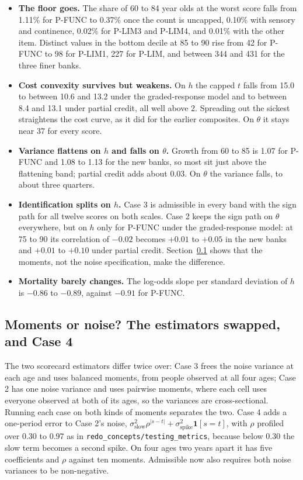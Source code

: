 \documentclass[11pt]{article}
\newcommand{\code}[1]{\texttt{\small #1}}
\begin{document}
\begin{itemize}\itemsep2pt
\item \textbf{The floor goes.} The share of 60 to 84 year olds at the worst
score falls from 1.11\% for P-FUNC to 0.37\% once the count is uncapped,
0.10\% with sensory and continence, 0.02\% for P-LIM3 and P-LIM4, and 0.01\%
with the other item. Distinct values in the bottom decile at 85 to 90 rise
from 42 for P-FUNC to 98 for P-LIM1, 227 for P-LIM, and between 344 and 431
for the three finer banks.
\item \textbf{Cost convexity survives but weakens.} On $h$ the capped $t$
falls from 15.0 to between 10.6 and 13.2 under the graded-response model and
to between 8.4 and 13.1 under partial credit, all well above 2. Spreading out
the sickest straightens the cost curve, as it did for the earlier composites.
On $\theta$ it stays near 37 for every score.
\item \textbf{Variance flattens on $h$ and falls on $\theta$.} Growth from 60
to 85 is 1.07 for P-FUNC and 1.08 to 1.13 for the new banks, so most sit just
above the flattening band; partial credit adds about 0.03. On $\theta$ the
variance falls, to about three quarters.
\item \textbf{Identification splits on $h$.} Case 3 is admissible in
every band with the sign path for all twelve scores on both scales. Case 2
keeps the sign path on $\theta$ everywhere, but on $h$ only for P-FUNC under
the graded-response model: at 75 to 90 its correlation of $-0.02$ becomes
$+0.01$ to $+0.05$ in the new banks and $+0.01$ to $+0.10$ under partial
credit. Section~\ref{sec:limident} shows that the moments, not the noise
specification, make the difference.
\item \textbf{Mortality barely changes.} The log-odds slope per standard
deviation of $h$ is $-0.86$ to $-0.89$, against $-0.91$ for P-FUNC.
\end{itemize}

\subsection{Moments or noise? The estimators swapped, and Case 4}
\label{sec:limident}
The two scorecard estimators differ twice over: Case 3 frees the noise
variance at each age and uses balanced moments, from people observed at all
four ages; Case 2 has one noise variance and uses pairwise moments, where each
cell uses everyone observed at both of its ages, so the variances are
cross-sectional. Running each case on both kinds of moments separates the two.
Case 4 adds a one-period error to Case 2's noise,
$\sigma^2_{\text{slow}}\rho^{|s-t|}+\sigma^2_{\text{spike}}\mathbf{1}[s=t]$,
with $\rho$ profiled over 0.30 to 0.97 as in \code{redo\_concepts/testing\_metrics},
because below 0.30 the slow term becomes a second spike. On four ages two years
apart it has five coefficients and $\rho$ against ten moments. Admissible
now also requires both noise variances to be non-negative.
\end{document}
